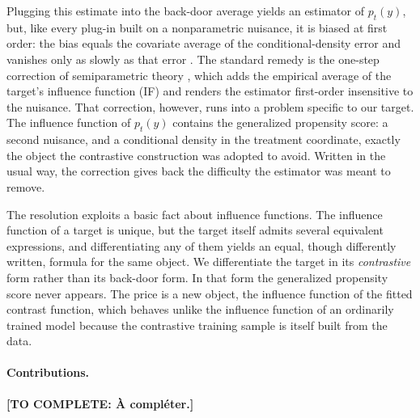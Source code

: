 \documentclass[11pt]{article}
\newcommand{\TODO}[1]{\textbf{[TO COMPLETE: #1]}}
\theoremstyle{plain}
\theoremstyle{definition}
\theoremstyle{remark}
\begin{document}
Plugging this estimate into the back-door average yields an estimator of $p_t(y)$, but, like
every plug-in built on a nonparametric nuisance, it is biased at first order: the bias
equals the covariate average of the conditional-density error and vanishes only as slowly as
that error \citep{bickel1988,robins2008}. The standard remedy is the one-step correction of
semiparametric theory \citep{vanderlaan2006tmle,chernozhukov2018,kennedy2022review}, which
adds the empirical average of the target's influence function (IF) and renders the estimator
first-order insensitive to the nuisance. That correction, however, runs into a problem specific to our target. The influence function
of $p_t(y)$ contains the generalized propensity score: a second nuisance, and a conditional
density in the treatment coordinate, exactly the object the contrastive construction was
adopted to avoid. Written in the usual way, the correction gives back the difficulty the
estimator was meant to remove.

The resolution exploits a basic fact about influence functions. The influence function of a
target is unique, but the target itself admits several equivalent expressions, and
differentiating any of them yields an equal, though differently written, formula for
the same object. We differentiate the target in its \emph{contrastive} form rather than its
back-door form. In that form the generalized propensity score never appears. The price is a
new object, the influence function of the fitted contrast function, which behaves unlike the
influence function of an ordinarily trained model because the contrastive training sample is
itself built from the data.

\paragraph{Contributions.}
\TODO{À compléter.}
\end{document}
